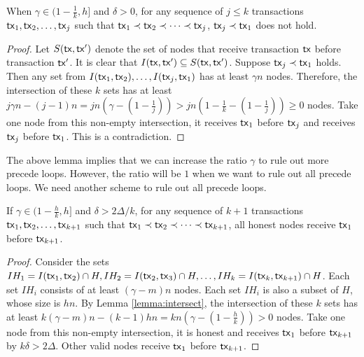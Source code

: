 \documentclass[runningheads]{llncs}
\begin{document}
\begin{lemma}
When $\gamma\in (1-\frac{1}{k}, h]$ and $\delta > 0$, for any sequence of $j\le k$ transactions $\mathsf{tx}_1, \mathsf{tx}_2, \dots, \mathsf{tx}_{j}$ such that $\mathsf{tx}_1\prec \mathsf{tx}_2\prec \cdots \prec \mathsf{tx}_{j}$, $\mathsf{tx}_{j}\prec \mathsf{tx}_1$ does not hold. 
\end{lemma}

\begin{proof}
    Let $S(\mathsf{tx}, \mathsf{tx}')$ denote the set of nodes that receive transaction $\mathsf{tx}$ before transaction $\mathsf{tx}'$. It is clear that $I(\mathsf{tx}, \mathsf{tx}')\subseteq S(\mathsf{tx}, \mathsf{tx}')$. Suppose $\mathsf{tx}_j\prec\mathsf{tx}_1$ holds. Then any set from $I(\mathsf{tx}_1,\mathsf{tx}_2), \dots, I(\mathsf{tx}_{j}, \mathsf{tx}_{1})$ has at least $\gamma n$ nodes. Therefore, the intersection of these $k$ sets has at least $j\gamma n - (j-1) n = jn(\gamma - (1-\frac{1}{j})) > jn(1-\frac{1}{k} - (1-\frac{1}{j})) \ge 0$ nodes. Take one node from this non-empty intersection, it receives $\mathsf{tx}_1$ before $\mathsf{tx}_j$ and receives $\mathsf{tx}_j$ before $\mathsf{tx}_1$. This is a contradiction. 
\end{proof}

The above lemma implies that we can increase the ratio $\gamma$ to rule out more precede loops. However, the ratio will be $1$ when we want to rule out all precede loops. We need another scheme to rule out all precede loops. 

\begin{lemma}
    If $\gamma \in (1-\frac{h}{k}, h]$ and $\delta > 2\Delta/k$, for any sequence of $k+1$ transactions $\mathsf{tx}_1, \mathsf{tx}_2, \dots, \mathsf{tx}_{k+1}$ such that $\mathsf{tx}_1\prec \mathsf{tx}_2\prec \cdots \prec \mathsf{tx}_{k+1}$, all honest nodes receive $\mathsf{tx}_1$ before $\mathsf{tx}_{k+1}$.
\end{lemma}
\begin{proof}
    Consider the sets $IH_1 = I(\mathsf{tx}_1, \mathsf{tx}_2)\cap H, IH_2 = I(\mathsf{tx}_2, \mathsf{tx}_3)\cap H, \dots, IH_k=I(\mathsf{tx}_k, \mathsf{tx}_{k+1})\cap H$. Each set $IH_i$ consists of at least $(\gamma-m)n$ nodes. Each set $IH_i$ is also a subset of $H$, whose size is $hn$. By Lemma \ref{lemma:intersect}, the intersection of these $k$ sets has at least $k(\gamma-m)n - (k-1)hn = kn(\gamma - (1-\frac{h}{k})) > 0$ nodes. Take one node from this non-empty intersection, it is honest and receives $\mathsf{tx}_1$ before $\mathsf{tx}_{k+1}$ by $k\delta > 2\Delta$. Other valid nodes receive $\mathsf{tx}_1$ before $\mathsf{tx}_{k+1}$. 
\end{proof}



\begin{credits}
\subsubsection{\ackname} 
\subsubsection{\discintname}

\end{credits}
%
%
%


%
\end{document}
